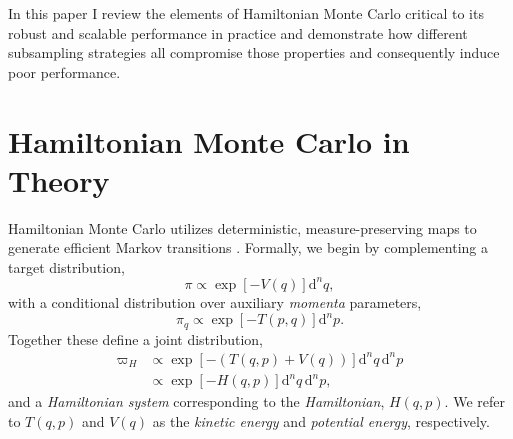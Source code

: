 \documentclass{article}
\begin{document}
In this paper I review the elements of Hamiltonian Monte Carlo critical to its
robust and scalable performance in practice and demonstrate how different 
subsampling strategies all compromise those properties and consequently 
induce poor performance. 

\section{Hamiltonian Monte Carlo in Theory}

Hamiltonian Monte Carlo utilizes deterministic, measure-preserving maps to 
generate efficient Markov transitions \citep{BetancourtEtAl:2014}.  Formally, 
we begin by complementing a target distribution,
%
\begin{equation*}
\pi \propto \exp \! \left[ - V ( q ) \right] \mathrm{d}^{n} q,
\end{equation*}
%
with a conditional distribution over auxiliary \textit{momenta} parameters,
%
\begin{equation*}
\pi_{q} \propto \exp \! \left[ - T (p, q) \right] \mathrm{d}^{n} p.
\end{equation*}
%
Together these define a joint distribution,
%
\begin{align*}
\varpi_{H} 
&\propto \exp \! \left[ - \left( T (q, p) + V (q) \right) \right] \mathrm{d}^{n} q \, \mathrm{d}^{n} p
\\
&\propto \exp \! \left[ - H (q, p) \right] \mathrm{d}^{n} q \, \mathrm{d}^{n} p,
\end{align*}
%
and a \textit{Hamiltonian system} corresponding to the \textit{Hamiltonian},
$H (q, p)$.  We refer to $T (q, p)$ and $V (q)$ as the \textit{kinetic energy} 
and \textit{potential energy}, respectively.
\end{document}
